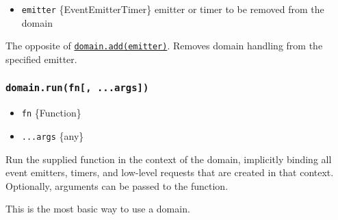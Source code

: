 \begin{itemize}
\tightlist
\item
  \texttt{emitter} \{EventEmitter\textbar Timer\} emitter or timer to be
  removed from the domain
\end{itemize}

The opposite of
\hyperref[domainaddemitter]{\texttt{domain.add(emitter)}}. Removes
domain handling from the specified emitter.

\subsubsection{\texorpdfstring{\texttt{domain.run(fn{[},\ ...args{]})}}{domain.run(fn{[}, ...args{]})}}\label{domain.runfn-...args}

\begin{itemize}
\tightlist
\item
  \texttt{fn} \{Function\}
\item
  \texttt{...args} \{any\}
\end{itemize}

Run the supplied function in the context of the domain, implicitly
binding all event emitters, timers, and low-level requests that are
created in that context. Optionally, arguments can be passed to the
function.

This is the most basic way to use a domain.


